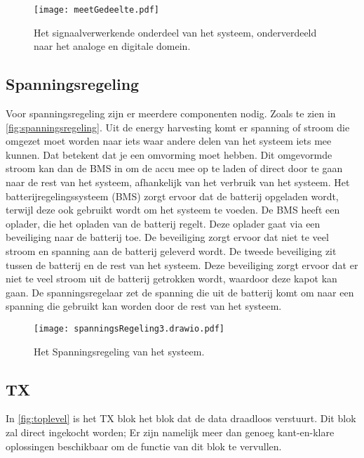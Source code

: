 \begin{figure}[ht]
    \centering
    \texttt{[image: meetGedeelte.pdf]}
    \caption{Het signaalverwerkende onderdeel van het systeem, onderverdeeld naar het analoge en digitale domein.}
    \label{fig:signaalverwerking}
\end{figure}

\subsection{Spanningsregeling}
Voor spanningsregeling zijn er meerdere componenten nodig. Zoals te zien in \autoref{fig:spanningsregeling}. Uit de energy harvesting komt er spanning of stroom die omgezet moet worden naar iets waar andere delen van het systeem iets mee kunnen. Dat betekent dat je een omvorming moet hebben. Dit omgevormde stroom kan dan de BMS in om de accu mee op te laden of direct door te gaan naar de rest van het systeem, afhankelijk van het verbruik van het systeem. 
Het batterijregelingssysteem (BMS) zorgt ervoor dat de batterij opgeladen wordt, terwijl deze ook gebruikt wordt om het systeem te voeden.
De BMS heeft een oplader, die het opladen van de batterij regelt. Deze oplader gaat via een beveiliging naar de batterij toe. De beveiliging zorgt ervoor dat niet te veel stroom en spanning aan de batterij geleverd wordt. De tweede beveiliging zit tussen de batterij en de rest van het systeem. Deze beveiliging zorgt ervoor dat er niet te veel stroom uit de batterij getrokken wordt, waardoor deze kapot kan gaan. De spanningsregelaar zet de spanning die uit de batterij komt om naar een spanning die gebruikt kan worden door de rest van het systeem. 

\begin{figure}[ht]
    \centering
    \texttt{[image: spanningsRegeling3.drawio.pdf]}
    \caption{Het Spanningsregeling van het systeem.}
    \label{fig:spanningsregeling}
\end{figure}

\subsection{TX}
In \autoref{fig:toplevel} is het TX blok het blok dat de data draadloos verstuurt. Dit blok zal direct ingekocht worden; Er zijn namelijk meer dan genoeg kant-en-klare oplossingen beschikbaar om de functie van dit blok te vervullen.



